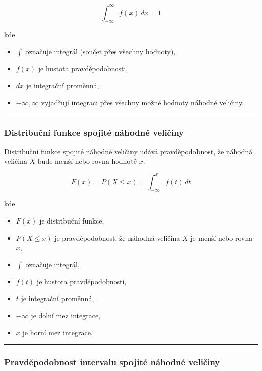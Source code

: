 \documentclass[a4paper, 11pt]{article}
\begin{document}
\begin{equation*}
	\int_{-\infty}^{\infty} f(x)\,dx = 1
\end{equation*}

kde

\begin{itemize}[noitemsep]
	\item $\int$ označuje integrál (součet přes všechny hodnoty),
	\item $f(x)$ je hustota pravděpodobnosti,
	\item $dx$ je integrační proměnná,
	\item $-\infty, \infty$ vyjadřují integraci přes všechny možné hodnoty
	      náhodné veličiny.
\end{itemize}

\noindent\hrule\medskip

\subsubsection{Distribuční funkce spojité náhodné veličiny}

Distribuční funkce spojité náhodné veličiny udává
pravděpodobnost, že náhodná veličina $X$ bude menší
nebo rovna hodnotě $x$.

\begin{equation*}
	F(x) = P(X \le x) = \int_{-\infty}^{x} f(t)\,dt
\end{equation*}

kde

\begin{itemize}[noitemsep]
	\item $F(x)$ je distribuční funkce,
	\item $P(X \le x)$ je pravděpodobnost, že náhodná veličina $X$ je menší nebo rovna $x$,
	\item $\int$ označuje integrál,
	\item $f(t)$ je hustota pravděpodobnosti,
	\item $t$ je integrační proměnná,
	\item $-\infty$ je dolní mez integrace,
	\item $x$ je horní mez integrace.
\end{itemize}

\noindent\hrule\medskip

\subsubsection{Pravděpodobnost intervalu spojité náhodné veličiny}
\end{document}
